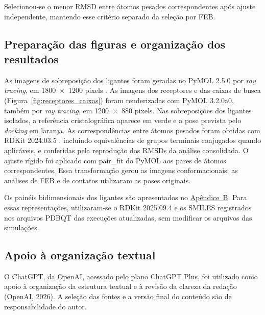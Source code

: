 Selecionou-se o menor RMSD entre átomos pesados correspondentes após ajuste independente, mantendo esse critério separado da seleção por FEB.



\subsection{Preparação das figuras e organização dos resultados}
As imagens de sobreposição dos ligantes foram geradas no PyMOL 2.5.0 por \textit{ray tracing}, em 1800~$\times$~1200 pixels \parencite{pymol}. As imagens dos receptores e das caixas de busca (Figura~\ref{fig:receptores_caixas}) foram renderizadas com PyMOL 3.2.0a0, também por \textit{ray tracing}, em 1200~$\times$~880 pixels. Nas sobreposições dos ligantes isolados, a referência cristalográfica aparece em verde e a pose prevista pelo \textit{docking} em laranja. As correspondências entre átomos pesados foram obtidas com RDKit 2024.03.5 \parencite{rdkit}, incluindo equivalências de grupos terminais conjugados quando aplicáveis, e conferidas pela reprodução dos RMSDs da análise consolidada. O ajuste rígido foi aplicado com \textnormal{pair\_fit} do PyMOL aos pares de átomos correspondentes. Essa transformação gerou as imagens conformacionais; as análises de FEB e de contatos utilizaram as poses originais.

Os painéis bidimensionais dos ligantes são apresentados no \hyperref[ap:estruturas_ligantes]{Apêndice~B}. Para essas representações, utilizaram-se o RDKit 2025.09.4 e os SMILES registrados nos arquivos PDBQT das execuções atualizadas, sem modificar os arquivos das simulações.

\subsection{Apoio à organização textual}
O ChatGPT, da OpenAI, acessado pelo plano ChatGPT Plus, foi utilizado como apoio à organização da estrutura textual e à revisão da clareza da redação (OpenAI, 2026). A seleção das fontes e a versão final do conteúdo são de responsabilidade do autor.
